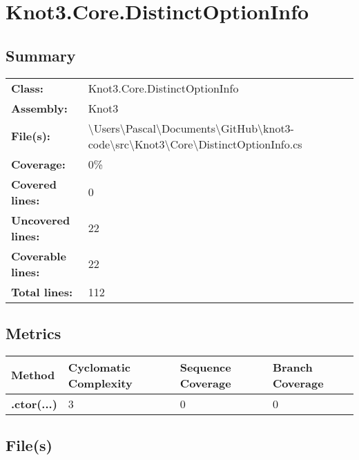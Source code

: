 \documentclass[a4paper,10pt]{article}
\begin{document}
\section{Knot3.Core.DistinctOptionInfo}
\subsection{Summary}
\begin{longtable}[l]{ll}
\textbf{Class:} & Knot3.Core.DistinctOptionInfo\\
\textbf{Assembly:} & Knot3\\
\textbf{File(s):} & \begin{minipage}[t]{12cm}{\textbackslash Users\textbackslash Pascal\textbackslash Documents\textbackslash GitHub\textbackslash knot3-code\textbackslash src\textbackslash Knot3\textbackslash Core\textbackslash DistinctOptionInfo.cs}\end{minipage} \\
\textbf{Coverage:} & 0\%\\
\textbf{Covered lines:} & 0\\
\textbf{Uncovered lines:} & 22\\
\textbf{Coverable lines:} & 22\\
\textbf{Total lines:} & 112\\
\end{longtable}
\subsection{Metrics}
\begin{longtable}[l]{|l|l|l|l|}
\hline
\textbf{Method} & \textbf{Cyclomatic Complexity} & \textbf{Sequence Coverage} & \textbf{Branch Coverage}\\
\hline
\textbf{.ctor(...)} & 3 & 0 & 0\\
\hline
\end{longtable}
\subsection{File(s)}
\end{document}
